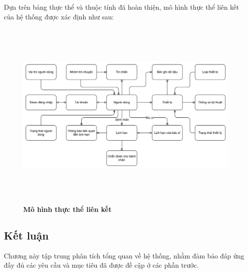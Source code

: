 Dựa trên bảng thực thể và thuộc tính đã hoàn thiện, mô hình thực thể liên kết của hệ thống được xác định như sau:

\begin{figure}[H]
	\centering
	\includegraphics[width=15cm,height=9.5cm]{Images/System/fmECG_connection_entity.png}
	\caption[Mô hình thực thể liên kết]{\bfseries \fontsize{12pt}{0pt}
	\selectfont Mô hình thực thể liên kết}
	\label{entity-diag}
  \end{figure}

\subsection{Kết luận}

Chương này tập trung phân tích tổng quan về hệ thống, nhằm đảm bảo đáp ứng đầy đủ các yêu cầu và mục tiêu đã được đề cập ở các phần trước.

\newpage
